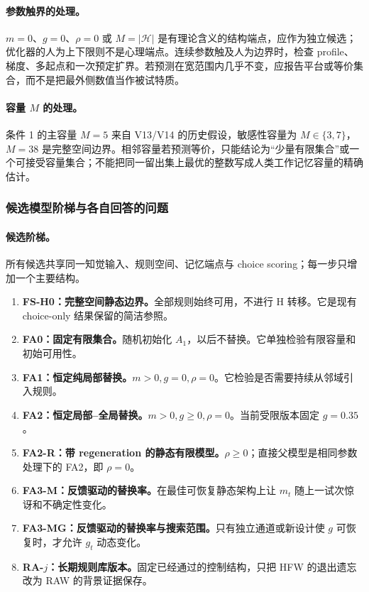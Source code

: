 \paragraph{参数触界的处理。}
$m=0$、$g=0$、$\rho=0$ 或 $M=|\mathcal H|$ 是有理论含义的结构端点，应作为独立候选；优化器的人为上下限则不是心理端点。连续参数触及人为边界时，检查 profile、梯度、多起点和一次预定扩界。若预测在宽范围内几乎不变，应报告平台或等价集合，而不是把最外侧数值当作被试特质。

\paragraph{容量 $M$ 的处理。}
条件 1 的主容量 $M=5$ 来自 V13/V14 的历史假设，敏感性容量为 $M\in\{3,7\}$，$M=38$ 是完整空间边界。相邻容量若预测等价，只能结论为“少量有限集合”或一个可接受容量集合；不能把同一留出集上最优的整数写成人类工作记忆容量的精确估计。


\subsubsection{候选模型阶梯与各自回答的问题}

\paragraph{候选阶梯。}
所有候选共享同一知觉输入、规则空间、记忆端点与 choice scoring；每一步只增加一个主要结构。
\begin{enumerate}
    \item \textbf{FS-H0：完整空间静态边界。}全部规则始终可用，不进行 H 转移。它是现有 choice-only 结果保留的简洁参照。
    \item \textbf{FA0：固定有限集合。}随机初始化 $A_1$，以后不替换。它单独检验有限容量和初始可用性。
    \item \textbf{FA1：恒定纯局部替换。}$m>0,g=0,\rho=0$。它检验是否需要持续从邻域引入规则。
    \item \textbf{FA2：恒定局部--全局替换。}$m>0,g\geq0,\rho=0$。当前受限版本固定 $g=0.35$。
    \item \textbf{FA2-R：带 regeneration 的静态有限模型。}$\rho\geq0$；直接父模型是相同参数处理下的 FA2，即 $\rho=0$。
    \item \textbf{FA3-M：反馈驱动的替换率。}在最佳可恢复静态架构上让 $m_t$ 随上一试次惊讶和不确定性变化。
    \item \textbf{FA3-MG：反馈驱动的替换率与搜索范围。}只有独立通道或新设计使 $g$ 可恢复时，才允许 $g_t$ 动态变化。
    \item \textbf{RA-$j$：长期规则库版本。}固定已经通过的控制结构，只把 HFW 的退出遗忘改为 RAW 的背景证据保存。
\end{enumerate}

